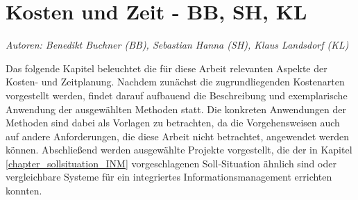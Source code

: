 
\chapter{Kosten und Zeit - BB, SH, KL}
\textit{Autoren: Benedikt Buchner (BB), Sebastian Hanna (SH), Klaus Landsdorf (KL)}

Das folgende Kapitel beleuchtet die für diese Arbeit relevanten Aspekte der Kosten- und Zeitplanung. Nachdem zunächst die zugrundliegenden Kostenarten vorgestellt werden, findet darauf aufbauend die Beschreibung und exemplarische Anwendung der ausgewählten Methoden statt. Die konkreten Anwendungen der Methoden sind dabei als Vorlagen zu betrachten, da die Vorgehensweisen auch auf andere Anforderungen, die diese Arbeit nicht betrachtet, angewendet werden k\"onnen. Abschließend werden ausgew\"ahlte Projekte vorgestellt, die der in Kapitel \ref{chapter_sollsituation_INM} vorgeschlagenen Soll-Situation \"ahnlich sind oder vergleichbare Systeme f\"ur ein integriertes Informationsmanagement errichten konnten.






